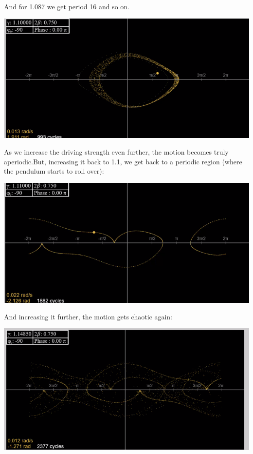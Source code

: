 And for 1.087 we get period 16 and so on.
\begin{center}
    \includegraphics[scale=0.7]{Lecture-33/l33-img13.png}
\end{center}
As we increase the driving strength even further, the motion becomes truly aperiodic.But, increasing it back to 1.1, we get back to a periodic region (where the pendulum starts to roll over):
\begin{center}
    \includegraphics[scale=0.7]{Lecture-33/l33-img14.png}
\end{center}
And increasing it further, the motion gets chaotic again:
\begin{center}
    \includegraphics[scale=0.7]{Lecture-33/l33-img15.png}
\end{center}

